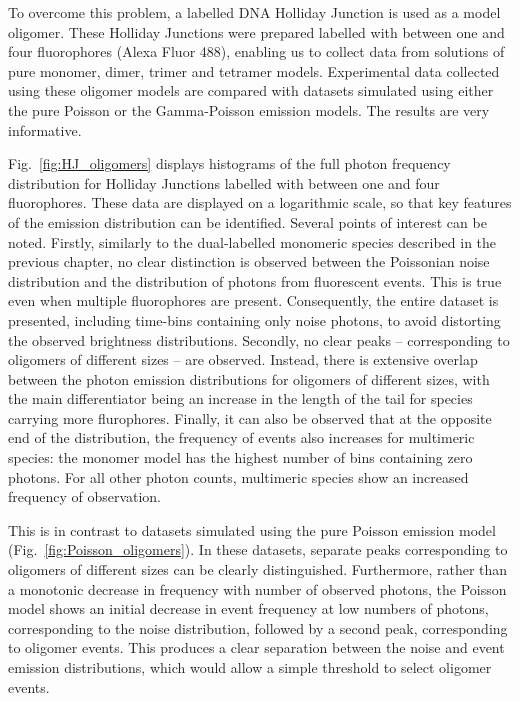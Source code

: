 To overcome this problem, a labelled DNA Holliday Junction is used as a model oligomer. These Holliday Junctions were prepared labelled with between one and four fluorophores (Alexa Fluor 488), enabling us to collect data from solutions of pure monomer, dimer, trimer and tetramer models. Experimental data collected using these oligomer models are compared with datasets simulated using either the pure Poisson or the Gamma-Poisson emission models. The results are very informative.

Fig.~\ref{fig:HJ_oligomers} displays histograms of the full photon frequency distribution for Holliday Junctions labelled with between one and four fluorophores. These data are displayed on a logarithmic scale, so that key features of the emission distribution can be identified. Several points of interest can be noted. Firstly, similarly to the dual-labelled monomeric species described in the previous chapter, no clear distinction is observed between the Poissonian noise distribution and the distribution of photons from fluorescent events. This is true even when multiple fluorophores are present. Consequently, the entire dataset is presented, including time-bins containing only noise photons, to avoid distorting the observed brightness distributions. Secondly, no clear peaks -- corresponding to oligomers of different sizes -- are observed. Instead, there is extensive overlap between the photon emission distributions for oligomers of different sizes, with the main differentiator being an increase in the length of the tail for species carrying more flurophores. Finally, it can also be observed that at the opposite end of the distribution, the frequency of events also increases for multimeric species: the monomer model has the highest number of bins containing zero photons. For all other photon counts, multimeric species show an increased frequency of observation. 

This is in contrast to datasets simulated using the pure Poisson emission model (Fig.~\ref{fig:Poisson_oligomers}). In these datasets, separate peaks corresponding to oligomers of different sizes can be clearly distinguished. Furthermore, rather than a monotonic decrease in frequency with number of observed photons, the Poisson model shows an initial decrease in event frequency at low numbers of photons, corresponding to the noise distribution, followed by a second peak, corresponding to oligomer events. This produces a clear separation between the noise and event emission distributions, which would allow a simple threshold to select oligomer events. 

